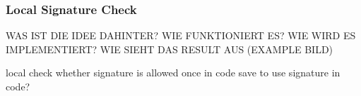 \subsubsection{Local Signature Check} \label{subsubsection:counter-tampering-signature-local}

WAS IST DIE IDEE DAHINTER? WIE FUNKTIONIERT ES? WIE WIRD ES IMPLEMENTIERT? WIE SIEHT DAS RESULT AUS (EXAMPLE BILD)\newline

local check whether signature is allowed\newline
once in code \newline
save to use signature in code?\newline


